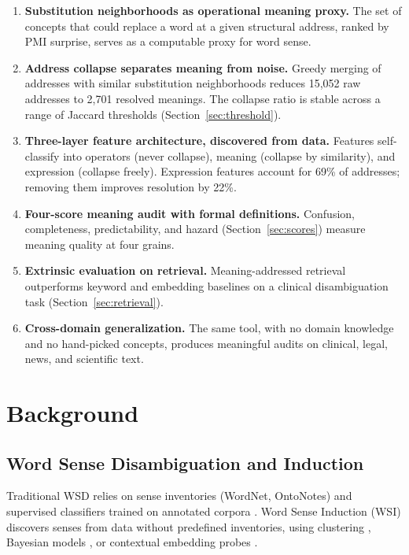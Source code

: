 \documentclass[11pt,a4paper]{article}
\begin{document}
\begin{enumerate}
\item \textbf{Substitution neighborhoods as operational meaning proxy.} The set of concepts that could replace a word at a given structural address, ranked by PMI surprise, serves as a computable proxy for word sense.

\item \textbf{Address collapse separates meaning from noise.} Greedy merging of addresses with similar substitution neighborhoods reduces 15,052 raw addresses to 2,701 resolved meanings. The collapse ratio is stable across a range of Jaccard thresholds (Section~\ref{sec:threshold}).

\item \textbf{Three-layer feature architecture, discovered from data.} Features self-classify into operators (never collapse), meaning (collapse by similarity), and expression (collapse freely). Expression features account for 69\% of addresses; removing them improves resolution by 22\%.

\item \textbf{Four-score meaning audit with formal definitions.} Confusion, completeness, predictability, and hazard (Section~\ref{sec:scores}) measure meaning quality at four grains.

\item \textbf{Extrinsic evaluation on retrieval.} Meaning-addressed retrieval outperforms keyword and embedding baselines on a clinical disambiguation task (Section~\ref{sec:retrieval}).

\item \textbf{Cross-domain generalization.} The same tool, with no domain knowledge and no hand-picked concepts, produces meaningful audits on clinical, legal, news, and scientific text.
\end{enumerate}

\section{Background}

\subsection{Word Sense Disambiguation and Induction}

Traditional WSD relies on sense inventories (WordNet, OntoNotes) and supervised classifiers trained on annotated corpora \citep{navigli2009}. Word Sense Induction (WSI) discovers senses from data without predefined inventories, using clustering \citep{schutze1998}, Bayesian models \citep{lau2012}, or contextual embedding probes \citep{amrami2018}.
\end{document}
